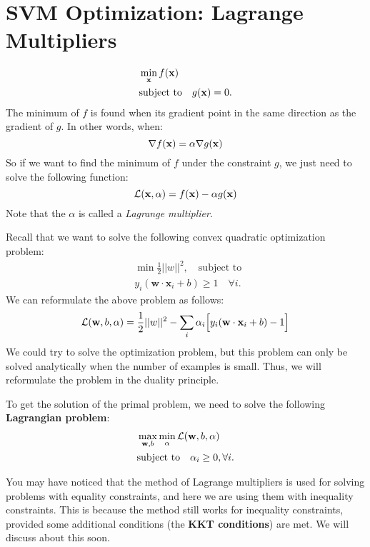 \section{SVM Optimization: Lagrange Multipliers}

\begin{align*}
&\min_{{\mathbf{x}}} f({\mathbf{x}}) \\
&\textrm{subject to}\quad g({\mathbf{x}})=0.\\
\end{align*}
The minimum of $f$ is found when its gradient point in the same direction as the gradient of $g$. In other words, when:  
$$\nabla f({\mathbf{x}}) = \alpha\nabla g({\mathbf{x}})$$
So if we want to find the minimum of $f$ under the constraint $g$, we just need to solve the following function: 
$$\mathcal{L}({\mathbf{x}}, \alpha) = f({\mathbf{x}}) - \alpha g({\mathbf{x}})$$
Note that the $\alpha$ is called a \textit{Lagrange multiplier}. 

Recall that we want to solve the following convex quadratic optimization problem:
\begin{align*}
	&\min \frac{1}{2}||w||^2,\quad \textrm{subject to } \\
	&y_i(\mathbf{w}\cdot \mathbf{x}_i+b)\geq 1 \quad\forall i.
\end{align*}
We can reformulate the above problem as follows:
\begin{align}
	\mathcal{L}({\mathbf{w}}, b, \alpha) = \frac{1}{2}||w||^2 - \sum_i \alpha_i \Big[y_i(\mathbf{w}\cdot \mathbf{x}_i+b)-1\Big]
	\label{eq:objective_function}
\end{align}
We could try to solve the optimization problem, but this problem can only be solved analytically when the number of examples is small. Thus, we will reformulate the problem in the duality principle. 

To get the solution of the primal problem, we need to solve the following \textbf{Lagrangian problem}: 
\begin{align*}
	&\max_{\mathbf{w}, b}\min_\alpha \mathcal{L}({\mathbf{w}}, b, \alpha)\\
	&\textrm{subject to}\quad \alpha_i\geq 0, \forall i.\\
\end{align*}

You may have noticed that the method of Lagrange multipliers is used for solving problems with equality constraints, and here we are using them with inequality constraints. This is because the method still works for inequality constraints, provided some additional conditions (the \textbf{KKT conditions}) are met. We will discuss about this soon.

